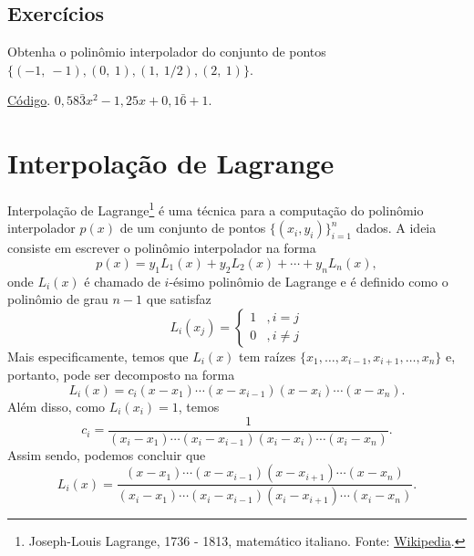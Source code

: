 \subsection*{Exercícios}

\begin{exer}\label{exer:interpoli_intro1}
  Obtenha o polinômio interpolador do conjunto de pontos $\{(-1,~-1), (0,~1), (1,~1/2), (2,~1)\}$.
\end{exer}
\begin{resp}
\ifisoctave
\href{https://github.com/phkonzen/notas/blob/master/src/MatematicaNumerica/cap_interp/dados/exer_interpoli_intro1/exer_interpoli_intro1.m}{Código}.
\fi
$0,58\bar{3}x^2 - 1,25x + 0,1\bar{6} + 1$.  
\end{resp}

\emconstrucao

\section{Interpolação de Lagrange}\label{cap_interp_sec_lagrange}

Interpolação de Lagrange\footnote{Joseph-Louis Lagrange, 1736 - 1813, matemático italiano. Fonte: \href{https://en.wikipedia.org/wiki/Joseph-Louis_Lagrange}{Wikipedia}.} é uma técnica para a computação do polinômio interpolador $p(x)$ de um conjunto de pontos $\{(x_i, y_i)\}_{i=1}^n$ dados. A ideia consiste em escrever o polinômio interpolador na forma
\begin{equation}
  p(x) = y_1L_1(x) + y_2L_2(x) + \cdots + y_nL_n(x),
\end{equation}
onde $L_i(x)$ é chamado de $i$-ésimo polinômio de Lagrange e é definido como o polinômio de grau $n-1$ que satisfaz
\begin{equation}
  L_i(x_j) = \left\{
    \begin{array}{ll}
      1 &, i=j\\
      0 &, i\neq j
    \end{array}
\right.
\end{equation}
Mais especificamente, temos que $L_i(x)$ tem raízes $\{x_1, \ldots, x_{i-1}, x_{i+1}, \ldots, x_n\}$ e, portanto, pode ser decomposto na forma
\begin{equation}
  L_i(x) = c_i(x-x_1)\cdots(x-x_{i-1})(x-x_i)\cdots(x-x_n).
\end{equation}
Além disso, como $L_i(x_i) = 1$, temos
\begin{equation}
  c_i = \frac{1}{(x_i-x_1)\cdots(x_i-x_{i-1})(x_i-x_i)\cdots(x_i-x_n)}.
\end{equation}
Assim sendo, podemos concluir que
\begin{equation}
  L_i(x) = \frac{(x-x_1)\cdots(x-x_{i-1})(x-x_{i+1})\cdots(x-x_n)}{(x_i-x_1)\cdots(x_i-x_{i-1})(x_i-x_{i+1})\cdots(x_i-x_n)}.
\end{equation}


